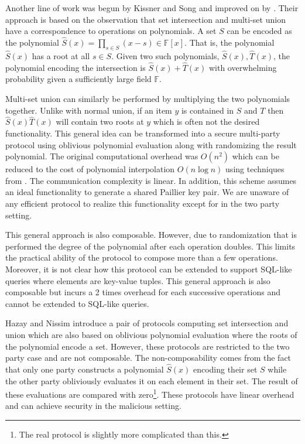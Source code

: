 \iffullversion
Another line of work was begun by Kissner and Song\cite{KS06} and improved on by \cite{MF06}. Their approach is based on the observation that set intersection and multi-set union have a correspondence to operations on polynomials. A set $S$ can be encoded as the polynomial $\hat S(x)= \prod_{s\in S}(x-s)\in \mathbb{F}[x]$. That is, the polynomial $\hat S(x)$ has a root at all $s\in S$. Given two such polynomials, $\hat S(x), \hat T(x)$, the polynomial encoding the intersection is $\hat S(x)+\hat T(x)$ with overwhelming probability given a sufficiently large field $\mathbb{F}$.

Multi-set union can similarly be performed by multiplying the two polynomials together. Unlike with normal union, if an item $y$ is contained in $S$ and $T$ then $\hat S(x)\hat T(x)$ will contain two roots at $y$ which is often not the desired functionality. This general idea can be transformed into a secure multi-party protocol using oblivious polynomial evaluation\cite{NP99} along with randomizing the result polynomial. The original computational overhead was $O(n^2)$ which can be reduced to the cost of polynomial interpolation $O(n\log n)$ using techniques from \cite{MF06}. The communication complexity is linear. In addition, this scheme assumes an ideal functionality to generate a shared Paillier key pair. We are unaware of any efficient protocol to realize this functionality except for \cite{RSA:HMRT12} in the two party setting.

This general approach is also composable. However, due to randomization that is performed the degree of the polynomial after each operation doubles. This limits the practical ability of the protocol to compose more than a few operations. Moreover, it is not clear how this protocol can be extended to support SQL-like queries where elements are key-value tuples. This general approach is also composable but incurs a 2 times overhead for each successive operations and cannot be extended to SQL-like queries. 
\fi


\iffullversion
Hazay and Nissim\cite{HN12} introduce a pair of protocols computing set intersection and union which are also based on oblivious polynomial evaluation where the roots of the polynomial encode a set. However, these protocols are restricted to the two party case and are not composable. The non-composability comes from the fact that only one party constructs a polynomial $\hat S(x)$ encoding their set $S$ while the other party obliviously evaluates it on each element in their set. The result of these evaluations are compared with zero\footnote{The real protocol is slightly more complicated than this.}. These protocols have linear overhead and can achieve security in the malicious setting.
\fi

